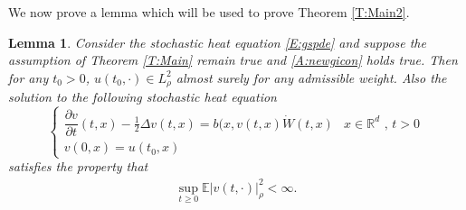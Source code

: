 \documentclass[a4paper,11pt]{article}%
\numberwithin{equation}{section}
\theoremstyle{plain}
\newtheorem{lemma}[theorem]{Lemma}
\theoremstyle{definition}
\newcommand{\R}{\mathbb{R}}
\newcommand{\E}{\mathbb{E}}
\begin{document}
We now prove a lemma which will be used to prove Theorem \ref{T:Main2}.

\begin{lemma}
	\label{L:Moments}
	Consider the stochastic heat equation \eqref{E:gspde} and suppose the assumption of Theorem \ref{T:Main} remain true and \eqref{A:newgicon} holds true. Then for any $t_0>0$, $u(t_0,\cdot)\in L^2_\rho$ almost surely for any admissible weight. Also the solution to the following stochastic heat equation
	\begin{equation}
	\label{E:vspde2}
	\begin{cases}
	\dfrac{\partial v}{\partial t}(t,x)-\frac{1}{2}\Delta v(t,x) = b(x,v(t,x)\dot W(t,x) & \text{$x\in \R^d$ , $t>0$}
	\\ v(0,x) = u(t_0,x)  &
	\end{cases}
	\end{equation}
	satisfies the property that
	\begin{align*}
	\sup_{t\ge 0} \E |v(t,\cdot)|_\rho^2 < \infty.
	\end{align*}
\end{lemma}
\end{document}
